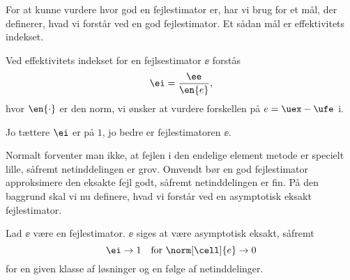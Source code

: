 For at kunne vurdere hvor god en fejlestimator er, har vi brug for et
mål, der definerer, hvad vi forstår ved en god fejlestimator. Et sådan
mål er effektivitets indekset.

\begin{definition}
Ved effektivitets indekset for en fejlsestimator $\ee$ forstås
\begin{equation}
  \ei = \frac{\ee}{\en{e}},
\end{equation}
hvor $\en{\cdot}$ er den norm, vi ønsker at vurdere forskellen på 
$e=\uex - \ufe$ i. 
\end{definition}

Jo tættere $\ei$ er på $1$, jo bedre er fejlestimatoren $\ee$. 

Normalt forventer man ikke, at fejlen i den endelige element metode er
specielt lille, såfremt netinddelingen er grov. Omvendt bør en god
fejlestimator approksimere den eksakte fejl godt, såfremt
netinddelingen er fin. På den baggrund skal vi nu definere, hvad vi
forstår ved en asymptotisk eksakt fejlestimator.
\begin{definition}
Lad $\ee$ være en fejlestimator. $\ee$ siges at være asymptotisk
eksakt, såfremt
\begin{equation}
  \ei \rightarrow 1 \quad \text{for $\norm[\cell]{e}\rightarrow 0$}
\end{equation}
for en given klasse af løsninger og en følge af netinddelinger.
\end{definition}